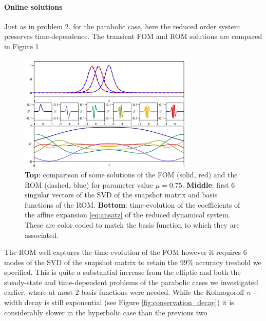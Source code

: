 \documentclass[../main.tex]{subfiles}
\begin{document}
\paragraph{Online solutions}\label{par:conservation_rom}

Just as in problem $2.$ for the parabolic case, here the reduced order system preserves time-dependence.
The transient FOM and ROM solutions are compared in Figure \ref{fig:conservation_rom}

\begin{figure}[H]
    \centering 
    \includegraphics[keepaspectratio, width=0.75\textwidth]{../figures/fig:conservation_rom.png}
    \caption{\textbf{Top}: comparison of some solutions of the FOM (solid, red) and the ROM (dashed, blue) for parameter value $\mu = 0.75$.
             \textbf{Middle}: first $6$ singular vectors of the SVD of the snapshot matrix and basis functions of the ROM.
     \textbf{Bottom}: time-evolution of the coefficients of the affine expansion \eqref{eq:ansatz} of the reduced dynamical system.
     These are color coded to match the basis function to which they are associated.
}
    \label{fig:conservation_rom}
\end{figure}

The ROM well captures the time-evolution of the FOM however it requires $6$ modes of the SVD of the snapshot matrix to retain the $99\%$ accuracy treshold we specified.
This is quite a substantial increase from the elliptic and both the steady-state and time-dependent problems of the parabolic cases we investigated earlier, where at most $2$ basis functions were needed.
While the Kolmogoroff $n-$width decay is still exponential (see Figure \ref{fig:conservation_decay}) it is considerably slower in the hyperbolic case than the previous two
\end{document}
